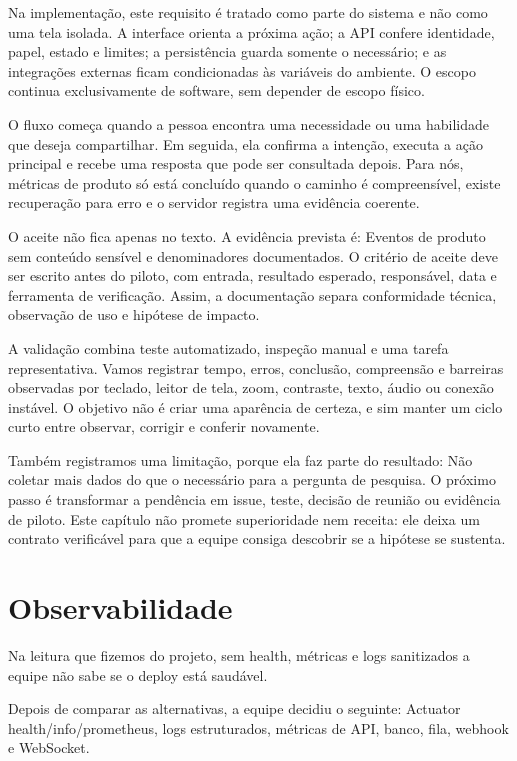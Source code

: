 \documentclass[12pt,oneside,a4paper,article]{abntex2}
\begin{document}
Na implementação, este requisito é tratado como parte do sistema e não como uma tela isolada. A interface orienta a próxima ação; a API confere identidade, papel, estado e limites; a persistência guarda somente o necessário; e as integrações externas ficam condicionadas às variáveis do ambiente. O escopo continua exclusivamente de software, sem depender de escopo físico.

O fluxo começa quando a pessoa encontra uma necessidade ou uma habilidade que deseja compartilhar. Em seguida, ela confirma a intenção, executa a ação principal e recebe uma resposta que pode ser consultada depois. Para nós, métricas de produto só está concluído quando o caminho é compreensível, existe recuperação para erro e o servidor registra uma evidência coerente.

O aceite não fica apenas no texto. A evidência prevista é: Eventos de produto sem conteúdo sensível e denominadores documentados. O critério de aceite deve ser escrito antes do piloto, com entrada, resultado esperado, responsável, data e ferramenta de verificação. Assim, a documentação separa conformidade técnica, observação de uso e hipótese de impacto.

A validação combina teste automatizado, inspeção manual e uma tarefa representativa. Vamos registrar tempo, erros, conclusão, compreensão e barreiras observadas por teclado, leitor de tela, zoom, contraste, texto, áudio ou conexão instável. O objetivo não é criar uma aparência de certeza, e sim manter um ciclo curto entre observar, corrigir e conferir novamente.

Também registramos uma limitação, porque ela faz parte do resultado: Não coletar mais dados do que o necessário para a pergunta de pesquisa. O próximo passo é transformar a pendência em issue, teste, decisão de reunião ou evidência de piloto. Este capítulo não promete superioridade nem receita: ele deixa um contrato verificável para que a equipe consiga descobrir se a hipótese se sustenta.

\section{Observabilidade}
Na leitura que fizemos do projeto, sem health, métricas e logs sanitizados a equipe não sabe se o deploy está saudável.

Depois de comparar as alternativas, a equipe decidiu o seguinte: Actuator health/info/prometheus, logs estruturados, métricas de API, banco, fila, webhook e WebSocket.
\end{document}
